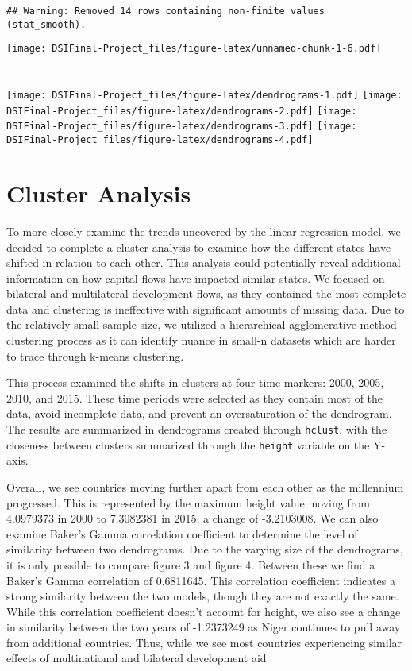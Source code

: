 \documentclass[
]{article}
\begin{document}
\begin{verbatim}
## Warning: Removed 14 rows containing non-finite values (stat_smooth).
\end{verbatim}

\texttt{[image: DSIFinal-Project\_files/figure-latex/unnamed-chunk-1-6.pdf]}

\hypertarget{section}{%
\section{}\label{section}}

\texttt{[image: DSIFinal-Project\_files/figure-latex/dendrograms-1.pdf]}
\texttt{[image: DSIFinal-Project\_files/figure-latex/dendrograms-2.pdf]}
\texttt{[image: DSIFinal-Project\_files/figure-latex/dendrograms-3.pdf]}
\texttt{[image: DSIFinal-Project\_files/figure-latex/dendrograms-4.pdf]}

\hypertarget{cluster-analysis}{%
\section{Cluster Analysis}\label{cluster-analysis}}

To more closely examine the trends uncovered by the linear regression
model, we decided to complete a cluster analysis to examine how the
different states have shifted in relation to each other. This analysis
could potentially reveal additional information on how capital flows
have impacted similar states. We focused on bilateral and multilateral
development flows, as they contained the most complete data and
clustering is ineffective with significant amounts of missing data. Due
to the relatively small sample size, we utilized a hierarchical
agglomerative method clustering process as it can identify nuance in
small-n datasets which are harder to trace through k-means clustering.

This process examined the shifts in clusters at four time markers: 2000,
2005, 2010, and 2015. These time periods were selected as they contain
most of the data, avoid incomplete data, and prevent an oversaturation
of the dendrogram. The results are summarized in dendrograms created
through \texttt{hclust}, with the closeness between clusters summarized
through the \texttt{height} variable on the Y-axis.

Overall, we see countries moving further apart from each other as the
millennium progressed. This is represented by the maximum height value
moving from 4.0979373 in 2000 to 7.3082381 in 2015, a change of
-3.2103008. We can also examine Baker's Gamma correlation coefficient to
determine the level of similarity between two dendrograms. Due to the
varying size of the dendrograms, it is only possible to compare figure 3
and figure 4. Between these we find a Baker's Gamma correlation of
0.6811645. This correlation coefficient indicates a strong similarity
between the two models, though they are not exactly the same. While this
correlation coefficient doesn't account for height, we also see a change
in similarity between the two years of -1.2373249 as Niger continues to
pull away from additional countries. Thus, while we see most countries
experiencing similar effects of multinational and bilateral development
aid
\end{document}
